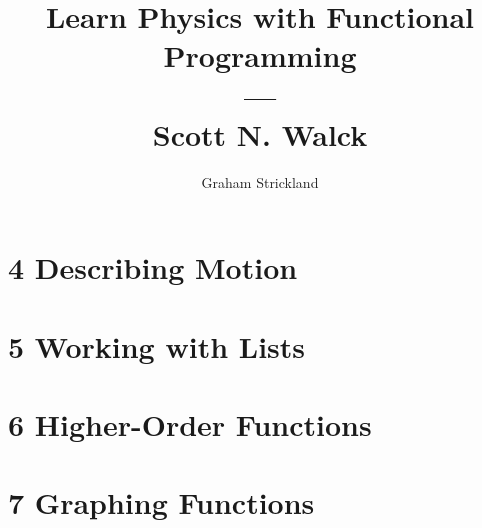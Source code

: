 \documentclass{article}
\title{Learn Physics with Functional Programming\\---\\Scott N. Walck}
\author{Graham Strickland}
\begin{document}
\maketitle  

\section*{4 Describing Motion}


\section*{5 Working with Lists}


\section*{6 Higher-Order Functions}


\section*{7 Graphing Functions}

\end{document}
